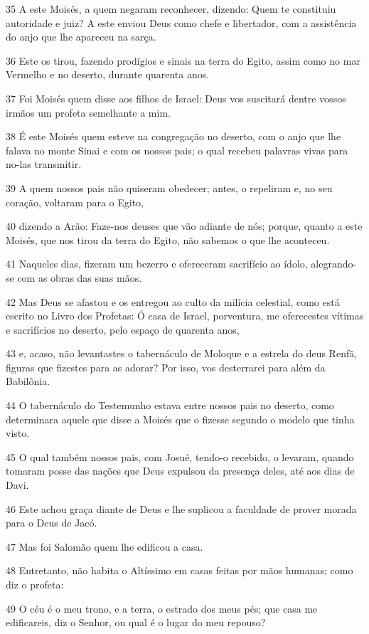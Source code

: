 \par 35 A este Moisés, a quem negaram reconhecer, dizendo: Quem te constituiu autoridade e juiz? A este enviou Deus como chefe e libertador, com a assistência do anjo que lhe apareceu na sarça.
\par 36 Este os tirou, fazendo prodígios e sinais na terra do Egito, assim como no mar Vermelho e no deserto, durante quarenta anos.
\par 37 Foi Moisés quem disse aos filhos de Israel: Deus vos suscitará dentre vossos irmãos um profeta semelhante a mim.
\par 38 É este Moisés quem esteve na congregação no deserto, com o anjo que lhe falava no monte Sinai e com os nossos pais; o qual recebeu palavras vivas para no-las transmitir.
\par 39 A quem nossos pais não quiseram obedecer; antes, o repeliram e, no seu coração, voltaram para o Egito,
\par 40 dizendo a Arão: Faze-nos deuses que vão adiante de nós; porque, quanto a este Moisés, que nos tirou da terra do Egito, não sabemos o que lhe aconteceu.
\par 41 Naqueles dias, fizeram um bezerro e ofereceram sacrifício ao ídolo, alegrando-se com as obras das suas mãos.
\par 42 Mas Deus se afastou e os entregou ao culto da milícia celestial, como está escrito no Livro dos Profetas: Ó casa de Israel, porventura, me oferecestes vítimas e sacrifícios no deserto, pelo espaço de quarenta anos,
\par 43 e, acaso, não levantastes o tabernáculo de Moloque e a estrela do deus Renfã, figuras que fizestes para as adorar? Por isso, vos desterrarei para além da Babilônia.
\par 44 O tabernáculo do Testemunho estava entre nossos pais no deserto, como determinara aquele que disse a Moisés que o fizesse segundo o modelo que tinha visto.
\par 45 O qual também nossos pais, com Josué, tendo-o recebido, o levaram, quando tomaram posse das nações que Deus expulsou da presença deles, até aos dias de Davi.
\par 46 Este achou graça diante de Deus e lhe suplicou a faculdade de prover morada para o Deus de Jacó.
\par 47 Mas foi Salomão quem lhe edificou a casa.
\par 48 Entretanto, não habita o Altíssimo em casas feitas por mãos humanas; como diz o profeta:
\par 49 O céu é o meu trono, e a terra, o estrado dos meus pés; que casa me edificareis, diz o Senhor, ou qual é o lugar do meu repouso?

